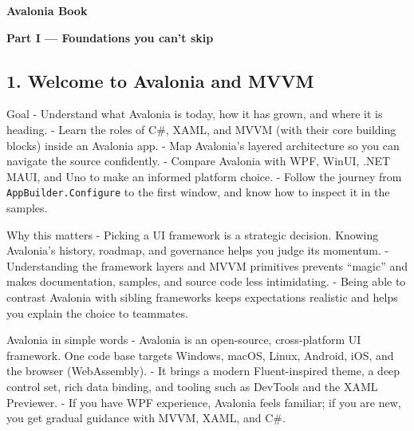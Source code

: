 \thispagestyle{empty}
\vspace*{\fill}
\begin{center}
{\Huge\bfseries Avalonia Book}
\end{center}
\vspace*{\fill}
\clearpage

\setcounter{tocdepth}{3}
\tableofcontents
\clearpage

{}
\thispagestyle{empty}
\vspace*{\fill}
\begin{center}
{\Huge\bfseries Part I — Foundations you can’t skip}
\end{center}
\vspace*{\fill}
\clearpage

\subsection{1. Welcome to Avalonia and
MVVM}\label{welcome-to-avalonia-and-mvvm}

Goal - Understand what Avalonia is today, how it has grown, and where it
is heading. - Learn the roles of C\#, XAML, and MVVM (with their core
building blocks) inside an Avalonia app. - Map Avalonia's layered
architecture so you can navigate the source confidently. - Compare
Avalonia with WPF, WinUI, .NET MAUI, and Uno to make an informed
platform choice. - Follow the journey from
\passthrough{\lstinline!AppBuilder.Configure!} to the first window, and
know how to inspect it in the samples.

Why this matters - Picking a UI framework is a strategic decision.
Knowing Avalonia's history, roadmap, and governance helps you judge its
momentum. - Understanding the framework layers and MVVM primitives
prevents ``magic'' and makes documentation, samples, and source code
less intimidating. - Being able to contrast Avalonia with sibling
frameworks keeps expectations realistic and helps you explain the choice
to teammates.

Avalonia in simple words - Avalonia is an open-source, cross-platform UI
framework. One code base targets Windows, macOS, Linux, Android, iOS,
and the browser (WebAssembly). - It brings a modern Fluent-inspired
theme, a deep control set, rich data binding, and tooling such as
DevTools and the XAML Previewer. - If you have WPF experience, Avalonia
feels familiar; if you are new, you get gradual guidance with MVVM,
XAML, and C\#.

